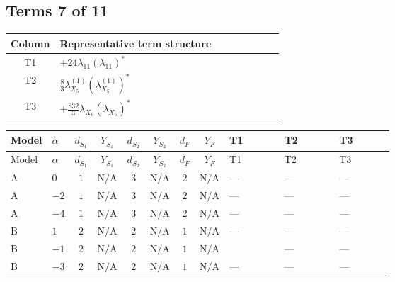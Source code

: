 \documentclass[8pt]{article}
\begin{document}
\begin{landscape}
\subsection*{Terms 7 of 11}
\begin{center}
\begin{tabular}{@{}c >{\raggedright\arraybackslash}p{0.82\linewidth}@{}}
\toprule
Column & Representative term structure \\
\midrule
T1 & \(\displaystyle +24 {\lambda_{11}} \left({\lambda_{11}}\right)^{*}\) \\
\midrule
T2 & \(\displaystyle \frac{8}{3} {\lambda_{X_{5}}^{(1)}} \left({\lambda_{X_{5}}^{(1)}}\right)^{*}\) \\
\midrule
T3 & \(\displaystyle +\frac{832}{3} {\lambda_{X_{6}}} \left({\lambda_{X_{6}}}\right)^{*}\) \\
\midrule
\bottomrule
\end{tabular}
\end{center}
\smallskip
\tiny
\begin{longtable}{@{}llcccccc >{\raggedright\arraybackslash}p{0.21\linewidth} >{\raggedright\arraybackslash}p{0.21\linewidth} >{\raggedright\arraybackslash}p{0.21\linewidth}@{}}
\toprule
Model & $\alpha$ & $d_{S_1}$ & $Y_{S_1}$ & $d_{S_2}$ & $Y_{S_2}$ & $d_F$ & $Y_F$ & T1 & T2 & T3 \\
\midrule
\endfirsthead
\toprule
Model & $\alpha$ & $d_{S_1}$ & $Y_{S_1}$ & $d_{S_2}$ & $Y_{S_2}$ & $d_F$ & $Y_F$ & T1 & T2 & T3 \\
\midrule
\endhead
A & $0$ & $1$ & $\text{N/A}$ & $3$ & $\text{N/A}$ & $2$ & $\text{N/A}$ & --- & --- & --- \\
\midrule
A & $-2$ & $1$ & $\text{N/A}$ & $3$ & $\text{N/A}$ & $2$ & $\text{N/A}$ & --- & --- & --- \\
\midrule
A & $-4$ & $1$ & $\text{N/A}$ & $3$ & $\text{N/A}$ & $2$ & $\text{N/A}$ & --- & --- & --- \\
\midrule
B & $1$ & $2$ & $\text{N/A}$ & $2$ & $\text{N/A}$ & $1$ & $\text{N/A}$ & --- & --- & --- \\
\midrule
B & $-1$ & $2$ & $\text{N/A}$ & $2$ & $\text{N/A}$ & $1$ & $\text{N/A}$ & \scriptsize\adjustbox{max width=\linewidth}{$\begin{gathered} +24 {\lambda_{11}} \left({\lambda_{11}}\right)^{*}\end{gathered}$} & --- & --- \\
\midrule
B & $-3$ & $2$ & $\text{N/A}$ & $2$ & $\text{N/A}$ & $1$ & $\text{N/A}$ & --- & --- & --- \\

\end{longtable}
\end{landscape}
\end{document}
